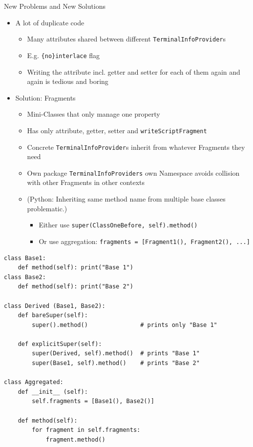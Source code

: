 \begin{frame}{New Problems and New Solutions}
%
\begin{itemize}
\item A lot of duplicate code
	\begin{itemize}
	\item Many attributes shared between different \texttt{TerminalInfoProvider}s
	\item E.\;g. \texttt{\{no\}interlace} flag
	\item Writing the attribute incl. getter and setter for each of them again and again is tedious and boring
	\end{itemize}
	\pause
\item Solution: Fragments
	\begin{itemize}
	\item Mini-Classes that only manage one property
	\item Has only attribute, getter, setter and \texttt{writeScriptFragment}
	\item Concrete \texttt{TerminalInfoProvider}s inherit from whatever Fragments they need
	\item Own package \texttt{TerminalInfoProviders} \Thus own Namespace avoids collision with other Fragments in other contexts
		\pause
	\item (Python: Inheriting same method name from multiple base classes problematic.)
		\begin{itemize}
		\item Either use \texttt{super(ClassOneBefore, self).method()}
		\item Or use aggregation: \texttt{fragments = [Fragment1(), Fragment2(), ...]}
		\end{itemize}
	\end{itemize}
\end{itemize}
%
\end{frame}


\begin{frame}[fragile]
%
\vspace{-5pt}
\begin{codebox}
\begin{verbatim}
class Base1:
    def method(self): print("Base 1")
class Base2:
    def method(self): print("Base 2")

class Derived (Base1, Base2):
    def bareSuper(self):
        super().method()               # prints only "Base 1"

    def explicitSuper(self):
        super(Derived, self).method()  # prints "Base 1"
        super(Base1, self).method()    # prints "Base 2"

class Aggregated:
    def __init__ (self):
        self.fragments = [Base1(), Base2()]

    def method(self):
        for fragment in self.fragments:
            fragment.method()
\end{verbatim}
\end{codebox}
%
\end{frame}

